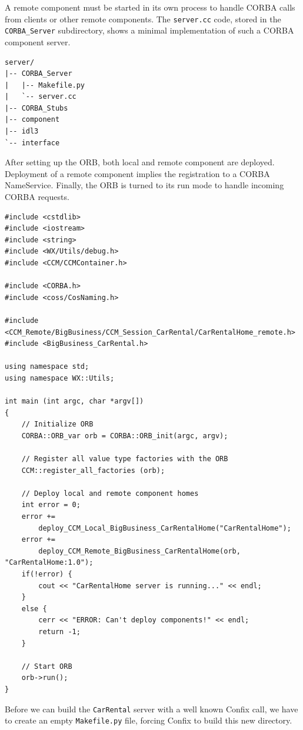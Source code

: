 A remote component must be started in its own process to handle CORBA calls
from clients or other remote components.
The {\tt server.cc} code, stored in the {\tt CORBA\_Server} subdirectory, 
shows a minimal implementation of such a CORBA component server.

\begin{small}
\begin{verbatim}
server/
|-- CORBA_Server
|   |-- Makefile.py
|   `-- server.cc
|-- CORBA_Stubs
|-- component
|-- idl3
`-- interface
\end{verbatim}
\end{small}

After setting up the ORB, both local and remote component are deployed.
Deployment of a remote component implies the registration to a CORBA NameService.
Finally, the ORB is turned to its run mode to handle incoming CORBA requests.

\begin{small}
\begin{verbatim}
#include <cstdlib> 
#include <iostream>
#include <string>
#include <WX/Utils/debug.h>
#include <CCM/CCMContainer.h>

#include <CORBA.h>
#include <coss/CosNaming.h>

#include <CCM_Remote/BigBusiness/CCM_Session_CarRental/CarRentalHome_remote.h>
#include <BigBusiness_CarRental.h>

using namespace std;
using namespace WX::Utils;

int main (int argc, char *argv[])
{
    // Initialize ORB 
    CORBA::ORB_var orb = CORBA::ORB_init(argc, argv);

    // Register all value type factories with the ORB  
    CCM::register_all_factories (orb);

    // Deploy local and remote component homes	
    int error = 0;
    error += 
        deploy_CCM_Local_BigBusiness_CarRentalHome("CarRentalHome");
    error += 
        deploy_CCM_Remote_BigBusiness_CarRentalHome(orb, "CarRentalHome:1.0");
    if(!error) {
        cout << "CarRentalHome server is running..." << endl;
    }
    else {
        cerr << "ERROR: Can't deploy components!" << endl;
        return -1;
    }

    // Start ORB
    orb->run();
}
\end{verbatim}
\end{small}

Before we can build the {\tt CarRental} server with a well known Confix call, 
we have to create an empty {\tt Makefile.py} file, forcing Confix to build 
this new directory.

